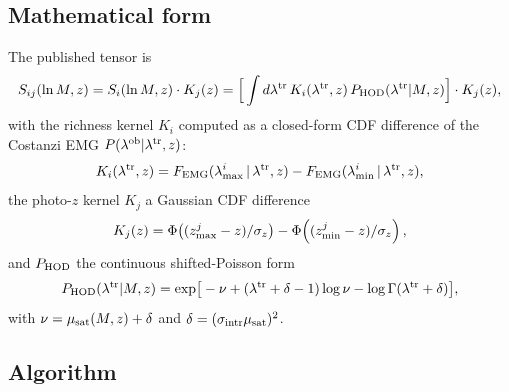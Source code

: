\documentclass[a4paper, 11pt]{article}
\newcommand{\lob}{\lambda^{\rm ob}}
\newcommand{\ltr}{\lambda^{\rm tr}}
\begin{document}
\subsection{Mathematical form}

The published tensor is
\begin{equation}
  S_{ij}(\ln M, z) = S_i(\ln M, z) \cdot K_j(z)
                   = \Big[ \int d\ltr\, K_i(\ltr, z)\, P_{\rm HOD}(\ltr | M, z) \Big]
                     \cdot K_j(z),
\end{equation}
with the richness kernel $K_i$ computed as a closed-form CDF
difference of the Costanzi EMG $P(\lob | \ltr, z)$:
\begin{equation}
  K_i(\ltr, z) = F_{\rm EMG}(\lambda_{\rm max}^i \,|\, \ltr, z)
               - F_{\rm EMG}(\lambda_{\rm min}^i \,|\, \ltr, z),
\end{equation}
the photo-$z$ kernel $K_j$ a Gaussian CDF difference
\begin{equation}
  K_j(z) = \Phi\!\left( (z_{\rm max}^j - z)/\sigma_z \right)
         - \Phi\!\left( (z_{\rm min}^j - z)/\sigma_z \right),
\end{equation}
and $P_{\rm HOD}$ the continuous shifted-Poisson form
\begin{equation}
  P_{\rm HOD}(\ltr | M, z)
  = \exp\!\big[ -\nu + (\ltr + \delta - 1)\log\nu
               - \log\Gamma(\ltr + \delta) \big],
\end{equation}
with $\nu = \mu_{\rm sat}(M,z) + \delta$ and $\delta = (\sigma_{\rm intr} \mu_{\rm sat})^2$.

\subsection{Algorithm}
\end{document}
